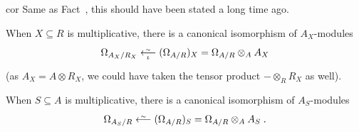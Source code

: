 \documentclass[a4paper,parskip=half,numbers=enddot, DIV=12, headheight=30pt]{scrreprt}
\begin{document}
\begin{varthm}{cor}
	Same as Fact~, this should have been stated a long time ago.
    \begin{alphanumerate}
        \item[\itememph{c}]
	        When $X\subseteq R$ is multiplicative, there is a canonical isomorphism of $A_X$-modules
	        \begin{align}\lbl{eq:KahlerLocalizationIso1}
		        \Omega_{A_X/R_X} \lisomorphism[\iota] (\Omega_{A/R})_X=\Omega_{A/R}\otimes _AA_X
	        \end{align}
	        (as $A_X=A\otimes R_X$, we could have taken the tensor product $-\otimes_RR_X$ as well).           
        \item[\itememph{d}]
	        When $S\subseteq A$ is multiplicative, there is a canonical isomorphism of $A_S$-modules
	        \begin{align}\lbl{eq:KahlerLocalizationIso2}
		        \Omega_{A_S/R} \lisomorphism(\Omega_{A/R})_S=\Omega_{A/R}\otimes_A A_S\;.
	        \end{align}
    \end{alphanumerate}
\end{varthm}
\end{document}
